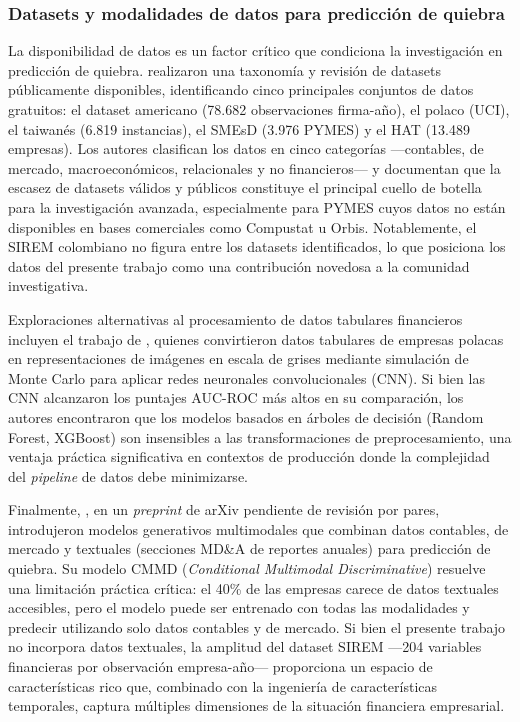 \documentclass[12pt, letterpaper]{article}
\begin{document}
\subsubsection{Datasets y modalidades de datos para predicci\'on de quiebra}

La disponibilidad de datos es un factor cr\'itico que condiciona la investigaci\'on en predicci\'on de quiebra. \citet{Wang2024datasets} realizaron una taxonom\'ia y revisi\'on de datasets p\'ublicamente disponibles, identificando cinco principales conjuntos de datos gratuitos: el dataset americano (78.682 observaciones firma-a\~no), el polaco (UCI), el taiwan\'es (6.819 instancias), el SMEsD (3.976 PYMES) y el HAT (13.489 empresas). Los autores clasifican los datos en cinco categor\'ias ---contables, de mercado, macroecon\'omicos, relacionales y no financieros--- y documentan que la escasez de datasets v\'alidos y p\'ublicos constituye el principal cuello de botella para la investigaci\'on avanzada, especialmente para PYMES cuyos datos no est\'an disponibles en bases comerciales como Compustat u Orbis. Notablemente, el SIREM colombiano no figura entre los datasets identificados, lo que posiciona los datos del presente trabajo como una contribuci\'on novedosa a la comunidad investigativa.

Exploraciones alternativas al procesamiento de datos tabulares financieros incluyen el trabajo de \citet{DzikWalczak2021}, quienes convirtieron datos tabulares de empresas polacas en representaciones de im\'agenes en escala de grises mediante simulaci\'on de Monte Carlo para aplicar redes neuronales convolucionales (CNN). Si bien las CNN alcanzaron los puntajes AUC-ROC m\'as altos en su comparaci\'on, los autores encontraron que los modelos basados en \'arboles de decisi\'on (Random Forest, XGBoost) son insensibles a las transformaciones de preprocesamiento, una ventaja pr\'actica significativa en contextos de producci\'on donde la complejidad del \textit{pipeline} de datos debe minimizarse.

Finalmente, \citet{Mancisidor2024}, en un \textit{preprint} de arXiv pendiente de revisi\'on por pares, introdujeron modelos generativos multimodales que combinan datos contables, de mercado y textuales (secciones MD\&A de reportes anuales) para predicci\'on de quiebra. Su modelo CMMD (\textit{Conditional Multimodal Discriminative}) resuelve una limitaci\'on pr\'actica cr\'itica: el 40\% de las empresas carece de datos textuales accesibles, pero el modelo puede ser entrenado con todas las modalidades y predecir utilizando solo datos contables y de mercado. Si bien el presente trabajo no incorpora datos textuales, la amplitud del dataset SIREM ---204 variables financieras por observaci\'on empresa-a\~no--- proporciona un espacio de caracter\'isticas rico que, combinado con la ingenier\'ia de caracter\'isticas temporales, captura m\'ultiples dimensiones de la situaci\'on financiera empresarial.
\end{document}
